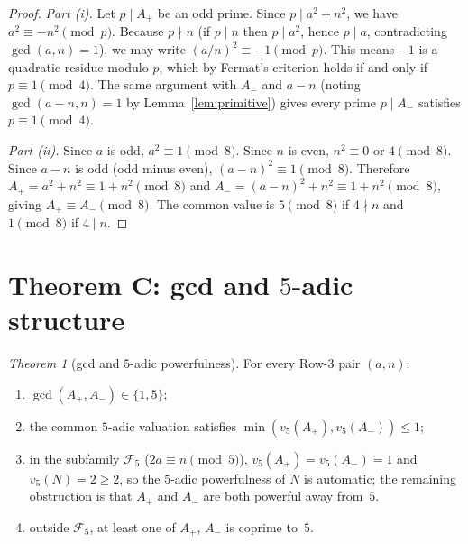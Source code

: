 \documentclass[12pt]{amsart}
\theoremstyle{plain}
\theoremstyle{definition}
\theoremstyle{remark}
\newtheorem{mainthm}{Theorem}
\newcommand{\Aplus}{A_{+}}
\newcommand{\Aminus}{A_{-}}
\begin{document}
\begin{proof}
\emph{Part (i).}  Let $p\mid\Aplus$ be an odd prime.  Since $p\mid a^2+n^2$,
we have $a^2\equiv -n^2\pmod{p}$.  Because $p\nmid n$ (if $p\mid n$ then
$p\mid a^2$, hence $p\mid a$, contradicting $\gcd(a,n)=1$), we may write
$(a/n)^2\equiv -1\pmod{p}$.  This means $-1$ is a quadratic residue
modulo $p$, which by Fermat's criterion holds if and only if
$p\equiv 1\pmod{4}$.  The same argument with $\Aminus$ and $a-n$
(noting $\gcd(a-n,n)=1$ by Lemma~\ref{lem:primitive}) gives every prime $p\mid\Aminus$ satisfies
$p\equiv 1\pmod{4}$.

\emph{Part (ii).}  Since $a$ is odd, $a^2\equiv 1\pmod{8}$.
Since $n$ is even, $n^2\equiv 0$ or $4\pmod{8}$.
Since $a-n$ is odd (odd minus even), $(a-n)^2\equiv 1\pmod{8}$.
Therefore $\Aplus = a^2+n^2\equiv 1+n^2\pmod{8}$ and
$\Aminus = (a-n)^2+n^2\equiv 1+n^2\pmod{8}$, giving
$\Aplus\equiv\Aminus\pmod{8}$.  The common value is
$5\pmod{8}$ if $4\nmid n$ and $1\pmod{8}$ if $4\mid n$.
\end{proof}

\section{Theorem C: gcd and $5$-adic structure}
\label{sec:thmgcd}

\begin{mainthm}[gcd and $5$-adic powerfulness]
\label{thm:gcd}
For every Row-3 pair $(a,n)$:
\begin{enumerate}[label=\textup{(\roman*)}]
\item $\gcd(\Aplus,\Aminus)\in\{1,5\}$;
\item the common $5$-adic valuation satisfies
  $\min(v_5(\Aplus),v_5(\Aminus))\leq 1$;
\item in the subfamily $\mathcal{F}_5$ \textup{(}$2a\equiv n\pmod{5}$\textup{)},
  $v_5(\Aplus)=v_5(\Aminus)=1$ and $v_5(N)=2\geq 2$, so the
  $5$-adic powerfulness of $N$ is automatic; the remaining obstruction is
  that $\Aplus$ and $\Aminus$ are both powerful away from~$5$.
\item outside $\mathcal{F}_5$, at least one of $\Aplus$, $\Aminus$
  is coprime to~$5$.
\end{enumerate}
\end{mainthm}
\end{document}
